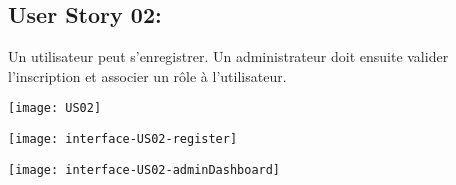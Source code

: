 \newpage{}
\subsection{User Story 02:}
Un utilisateur peut s'enregistrer. Un administrateur doit ensuite valider l'inscription et associer un rôle à l'utilisateur.

  \begin{center}
        \texttt{[image: US02]}
  \end{center}


  \begin{center}
        \texttt{[image: interface-US02-register]}
  \end{center}


  \begin{center}
        \texttt{[image: interface-US02-adminDashboard]}
  \end{center}